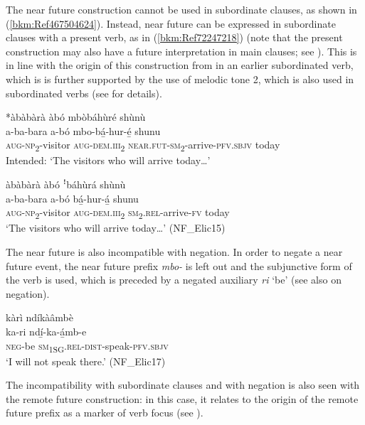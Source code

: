 The near future construction cannot be used in subordinate clauses, as shown in (\ref{bkm:Ref467504624}). Instead, near future can be expressed in subordinate clauses with a present verb, as in (\ref{bkm:Ref72247218}) (note that the present construction may also have a future interpretation in main clauses; see ). This is in line with the origin of this construction from in an earlier subordinated verb, which is is further supported by the use of melodic tone 2, which is also used in subordinated verbs (see  for details).

\ea
 *àbàbàrà àbó mbòbáhùré shùnù\\
\gll a-ba-bara    a-bó    mbo-bá̲-hur-é̲      shunu\\
\textsc{aug}-\textsc{np}\textsubscript{2}-visitor  \textsc{aug}-\textsc{dem}.\textsc{iii}\textsubscript{2} \textsc{near}.\textsc{fut}-\textsc{sm}\textsubscript{2}-arrive-\textsc{pfv}.\textsc{sbjv}  today\\
Intended: ‘The visitors who will arrive today…’
\z

\ea
\label{bkm:Ref72247218}
àbàbàrà àbó ꜝbáhùrá shùnù\\
\gll a-ba-bara    a-bó    bá̲-hur-á̲    shunu\\
\textsc{aug}-\textsc{np}\textsubscript{2}-visitor  \textsc{aug}-\textsc{dem}.\textsc{iii}\textsubscript{2}  \textsc{sm}\textsubscript{2}.\textsc{rel}-arrive-\textsc{fv}  today\\
\glt ‘The visitors who will arrive today…’ (NF\_Elic15)\label{bkm:Ref467504624}
\z

The near future is also incompatible with negation. In order to negate a near future event, the near future prefix \textit{mbo-} is left out and the subjunctive form of the verb is used, which is preceded by a negated auxiliary \textit{ri} ‘be’ (see also  on negation).

\ea
kàrì ndíkàâmbè\\
\gll ka-ri    ndí̲-ka-á̲mb-e\\
\textsc{neg}-be  \textsc{sm}\textsubscript{1SG}.\textsc{rel}-\textsc{dist}-speak-\textsc{pfv}.\textsc{sbjv}\\
\glt ‘I will not speak there.’ (NF\_Elic17)
\z

The incompatibility with subordinate clauses and with negation is also seen with the remote future construction: in this case, it relates to the origin of the remote future prefix as a marker of verb focus (see ).

